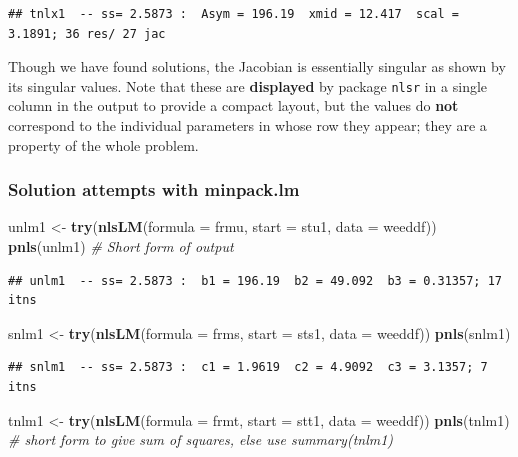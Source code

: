 \documentclass[
]{article}
\newenvironment{Shaded}{\begin{snugshade}}{\end{snugshade}}
\newcommand{\AttributeTok}[1]{\textcolor[rgb]{0.13,0.29,0.53}{#1}}
\newcommand{\CommentTok}[1]{\textcolor[rgb]{0.56,0.35,0.01}{\textit{#1}}}
\newcommand{\FunctionTok}[1]{\textcolor[rgb]{0.13,0.29,0.53}{\textbf{#1}}}
\newcommand{\NormalTok}[1]{#1}
\newcommand{\OtherTok}[1]{\textcolor[rgb]{0.56,0.35,0.01}{#1}}
\begin{document}
\begin{verbatim}
## tnlx1  -- ss= 2.5873 :  Asym = 196.19  xmid = 12.417  scal = 3.1891; 36 res/ 27 jac
\end{verbatim}

Though we have found solutions, the Jacobian is essentially singular as
shown by its singular values. Note that these are \textbf{displayed} by
package \texttt{nlsr} in a single column in the output to provide a
compact layout, but the values do \textbf{not} correspond to the
individual parameters in whose row they appear; they are a property of
the whole problem.

\hypertarget{solution-attempts-with-minpack.lm}{%
\subsubsection{Solution attempts with
minpack.lm}\label{solution-attempts-with-minpack.lm}}

\begin{Shaded}
\begin{Highlighting}[]
\NormalTok{unlm1 }\OtherTok{\textless{}{-}} \FunctionTok{try}\NormalTok{(}\FunctionTok{nlsLM}\NormalTok{(}\AttributeTok{formula =}\NormalTok{ frmu, }\AttributeTok{start =}\NormalTok{ stu1, }\AttributeTok{data =}\NormalTok{ weeddf))}
\FunctionTok{pnls}\NormalTok{(unlm1)  }\CommentTok{\# Short form of output}
\end{Highlighting}
\end{Shaded}

\begin{verbatim}
## unlm1  -- ss= 2.5873 :  b1 = 196.19  b2 = 49.092  b3 = 0.31357; 17  itns
\end{verbatim}

\begin{Shaded}
\begin{Highlighting}[]
\NormalTok{snlm1 }\OtherTok{\textless{}{-}} \FunctionTok{try}\NormalTok{(}\FunctionTok{nlsLM}\NormalTok{(}\AttributeTok{formula =}\NormalTok{ frms, }\AttributeTok{start =}\NormalTok{ sts1, }\AttributeTok{data =}\NormalTok{ weeddf))}
\FunctionTok{pnls}\NormalTok{(snlm1)}
\end{Highlighting}
\end{Shaded}

\begin{verbatim}
## snlm1  -- ss= 2.5873 :  c1 = 1.9619  c2 = 4.9092  c3 = 3.1357; 7  itns
\end{verbatim}

\begin{Shaded}
\begin{Highlighting}[]
\NormalTok{tnlm1 }\OtherTok{\textless{}{-}} \FunctionTok{try}\NormalTok{(}\FunctionTok{nlsLM}\NormalTok{(}\AttributeTok{formula =}\NormalTok{ frmt, }\AttributeTok{start =}\NormalTok{ stt1, }\AttributeTok{data =}\NormalTok{ weeddf))}
\FunctionTok{pnls}\NormalTok{(tnlm1) }\CommentTok{\# short form to give sum of squares, else use summary(tnlm1)}
\end{Highlighting}
\end{Shaded}
\end{document}
